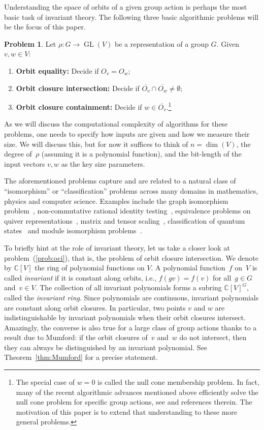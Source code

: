 \documentclass[10pt,a4paper]{article}
\DeclareMathOperator{\GL}{GL}
\theoremstyle{definition}
\newtheorem{problem}[theorem]{Problem}
\numberwithin{equation}{section}
\newcommand{\CC}{\mathbb{C}}
\begin{document}
Understanding the space of orbits of a given group action is perhaps the most basic task of invariant theory. The following three basic algorithmic problems will be the focus of this paper.

\begin{problem}\label{prob:main}
Let $\rho \colon G \rightarrow \GL(V)$ be a representation of a group $G$. Given $v,w \in V$:
\begin{enumerate}
\item \textbf{Orbit equality:} Decide if $O_v = O_w$;
\item\label{prob:oci} \textbf{Orbit closure intersection:} Decide if $\overline{O_v} \cap \overline{O_w} \ne \emptyset$;
\item \textbf{Orbit closure containment:} Decide if $w \in \overline{O_v}$.\footnote{The special case of $w = 0$ is called the null cone membership problem. In fact, many of the recent algorithmic advances mentioned above efficiently solve the null cone problem for specific group actions, see \cite{BFGOWW2} and references therein. The motivation of this paper is to extend that understanding to these more general problems.}
\end{enumerate}
\end{problem}

As we will discuss the computational complexity of algorithms for these problems, one needs to specify how inputs are given and how we measure their size.
We will discuss this, but for now it suffices to think of $n=\dim(V)$, the degree of~$\rho$ (assuming it is a polynomial function), and the bit-length of the input vectors $v,w$ as the key size parameters.


The aforementioned problems capture and are related to a natural class of ``isomorphism'' or ``classification'' problems across many domains in mathematics, physics and computer science.
Examples include the graph isomorphism problem~\cite{Derksen-graph}, non-commutative rational identity testing~\cite{GGOW16,IQS2}, equivalence problems on quiver representations~\cite{DM-arbchar,DM-si}, matrix and tensor scaling~\cite{BGOWW,BFGOWW}, classification of quantum states~\cite{bennett1993teleporting} and module isomorphism problems~\cite{BL08}.

To briefly hint at the role of invariant theory, let us take a closer look at problem~(\ref{prob:oci}), that is, the problem of orbit closure intersection.
We denote by $\CC[V]$ the ring of polynomial functions on $V$.
A polynomial function~$f$ on~$V$ is called \emph{invariant} if it is constant along orbits, i.e., $f(gv) = f(v)$ for all~$g \in G$ and~$v \in V$.
The collection of all invariant polynomials forms a subring $\CC[V]^G$, called the \emph{invariant ring}.
Since polynomials are continuous, invariant polynomials are constant along orbit closures.
In particular, two points $v$ and $w$ are indistinguishable by invariant polynomials when their orbit closures intersect.
Amazingly, the converse is also true for a large class of group actions thanks to a result due to Mumford: if the orbit closures of~$v$ and~$w$ do not intersect, then they can always be distinguished by an invariant polynomial.
See Theorem~\ref{thm:Mumford} for a precise statement.
\end{document}
